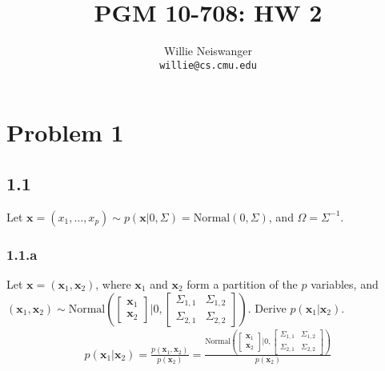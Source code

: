 \documentclass[12pt]{article}
\title{PGM 10-708: HW 2}
\author{Willie Neiswanger\\
\texttt{willie@cs.cmu.edu}}
\date{}
\begin{document}
\maketitle


\section*{Problem 1}
\label{sec:prob1}

\subsection*{1.1}
Let $\textbf{x} = (x_1,\ldots,x_p) \sim p(\textbf{x} | 0, \Sigma) = \text{Normal}(0,\Sigma)$, and $\Omega = \Sigma^{-1}$.

\subsubsection*{1.1.a}
Let $\textbf{x} = (\textbf{x}_1,\textbf{x}_2)$, where $\textbf{x}_1$ and $\textbf{x}_2$ form a partition of the $p$ variables, and 
$(\textbf{x}_1,\textbf{x}_2) \sim 
\text{Normal} \left( \left[ \begin{smallmatrix} \textbf{x}_1 \\ \textbf{x}_2 \end{smallmatrix} \right] | 0, \left[ \begin{smallmatrix} \Sigma_{1,1}& \Sigma_{1,2} \\ \Sigma_{2,1} & \Sigma_{2,2} \end{smallmatrix} \right] \right)$.
Derive $p(\textbf{x}_1 | \textbf{x}_2)$.\\

\begin{equation*}
    \begin{split}
        p(\textbf{x}_1 | \textbf{x}_2) = \frac{p(\textbf{x}_1, \textbf{x}_2)}{p(\textbf{x}_2)}
            = \frac{\text{Normal} \left( \left[ \begin{smallmatrix} \textbf{x}_1 \\ \textbf{x}_2 \end{smallmatrix} \right] | 0, \left[ \begin{smallmatrix} \Sigma_{1,1}& \Sigma_{1,2} \\ \Sigma_{2,1} & \Sigma_{2,2} \end{smallmatrix} \right] \right)}{p(\textbf{x}_2)}
    \end{split}
\end{equation*}
\end{document}
